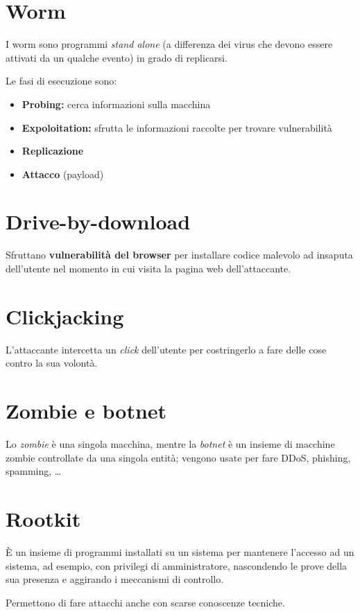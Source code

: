 \section{Worm}
I worm sono programmi \textit{stand alone} (a differenza dei virus che devono essere attivati 
da un qualche evento) in grado di replicarsi.

\noindent Le fasi di esecuzione sono:
\begin{itemize}
    \item \textbf{Probing:} cerca informazioni sulla macchina 
    \item \textbf{Expoloitation:} sfrutta le informazioni raccolte per trovare vulnerabilità
    \item \textbf{Replicazione}
    \item \textbf{Attacco} (payload)
\end{itemize}

\section{Drive-by-download}
Sfruttano \textbf{vulnerabilità del browser} per installare codice malevolo ad insaputa dell'utente 
nel momento in cui visita la pagina web dell'attaccante. 

\section{Clickjacking}
L'attaccante intercetta un \textit{click} dell'utente per costringerlo a fare delle cose 
contro la sua volontà.

\section{Zombie e botnet}
Lo \textit{zombie} è una singola macchina, mentre la \textit{botnet} è un insieme di macchine 
zombie controllate da una singola entità; vengono usate per fare DDoS, phishing, spamming, \dots

\section{Rootkit}
È un insieme di programmi installati su un sistema per mantenere l'accesso ad un sistema, ad 
esempio, con privilegi di amministratore, nascondendo le prove della sua presenza e aggirando 
i meccanismi di controllo.

\noindent Permettono di fare attacchi anche con scarse conoscenze tecniche.

